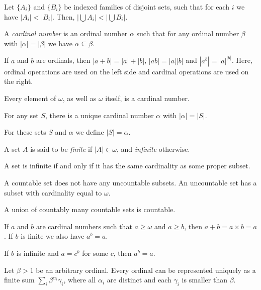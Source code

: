 \begin{thm}[K\"onig]
    Let $\{A_i\}$ and $\{B_i\}$ be indexed families of disjoint sets, such that
    for each $i$ we have $|A_i|<|B_i|$. Then, $\left|\bigcup
    A_i\right|<\left|\bigcup B_i\right|$.
\end{thm}
\begin{defn}
  A \emph{cardinal number} is an ordinal number $\alpha$ such that for any
  ordinal number $\beta$ with $|\alpha|=|\beta|$ we have $\alpha\subseteq\beta$.
\end{defn}
\begin{prop}
    If $a$ and $b$ are ordinals, then $|a+b|=|a|+|b|$, $|ab|=|a||b|$ and
    $|a^b|=|a|^{|b|}$. 
    Here, ordinal operations are used on the left side and cardinal operations are
    used on the right.
\end{prop}
\begin{prop}
  Every element of $\omega$, as well as $\omega$ itself, is a cardinal number.
\end{prop}
\begin{prop}
  For any set $S$, there is a unique cardinal number $\alpha$ with
  $|\alpha|=|S|$.
\end{prop}
\begin{defn}
  For these sets $S$ and $\alpha$ we define $|S|=\alpha$.
\end{defn}
\begin{defn}
  A set $A$ is said to be \emph{finite} if $|A|\in\omega$, and \emph{infinite}
  otherwise.
\end{defn}
\begin{prop}
  A set is infinite if and only if it has the same cardinality as some proper
  subset.
\end{prop}
\begin{prop}
  A countable set does not have any uncountable subsets. An uncountable set has
  a subset with cardinality equal to $\omega$.
\end{prop}
\begin{prop}
  A union of countably many countable sets is countable.
\end{prop}
\begin{prop}
  If $a$ and $b$ are cardinal numbers such that $a\ge\omega$ and $a\ge b$,
  then $a+b=a\times b=a$. If $b$ is finite we also have $a^b=a$.
\end{prop}
\begin{cor}
    If $b$ is infinite and $a=c^b$ for some $c$, then $a^b=a$.
\end{cor}
\begin{prop}
    Let $\beta>1$ be an arbitrary ordinal. Every ordinal
    can be represented uniquely as a finite sum
    $\sum_i \beta^{\alpha_i}\gamma_i$, where all $\alpha_i$ are distinct and
    each $\gamma_i$ is smaller than $\beta$.
\end{prop}
